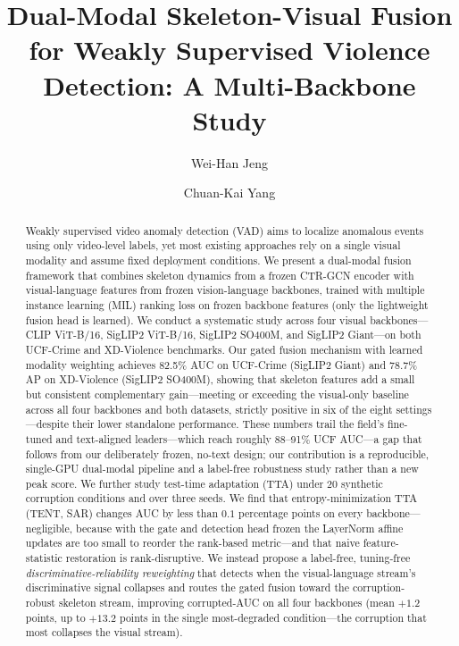 \documentclass[sigconf]{acmart}
\begin{document}
\title{Dual-Modal Skeleton-Visual Fusion for Weakly Supervised Violence Detection: A Multi-Backbone Study}

\author{Wei-Han Jeng}

\author{Chuan-Kai Yang}

\begin{abstract}
Weakly supervised video anomaly detection (VAD) aims to localize anomalous events using only video-level labels, yet most existing approaches rely on a single visual modality and assume fixed deployment conditions. We present a dual-modal fusion framework that combines skeleton dynamics from a frozen CTR-GCN encoder with visual-language features from frozen vision-language backbones, trained with multiple instance learning (MIL) ranking loss on frozen backbone features (only the lightweight fusion head is learned). We conduct a systematic study across four visual backbones---CLIP ViT-B/16, SigLIP2 ViT-B/16, SigLIP2 SO400M, and SigLIP2 Giant---on both UCF-Crime and XD-Violence benchmarks. Our gated fusion mechanism with learned modality weighting achieves 82.5\% AUC on UCF-Crime (SigLIP2 Giant) and 78.7\% AP on XD-Violence (SigLIP2 SO400M), showing that skeleton features add a small but consistent complementary gain---meeting or exceeding the visual-only baseline across all four backbones and both datasets, strictly positive in six of the eight settings---despite their lower standalone performance. These numbers trail the field's fine-tuned and text-aligned leaders---which reach roughly 88--91\% UCF AUC---a gap that follows from our deliberately frozen, no-text design; our contribution is a reproducible, single-GPU dual-modal pipeline and a label-free robustness study rather than a new peak score. We further study test-time adaptation (TTA) under 20 synthetic corruption conditions and over three seeds. We find that entropy-minimization TTA (TENT, SAR) changes AUC by less than $0.1$ percentage points on every backbone---negligible, because with the gate and detection head frozen the LayerNorm affine updates are too small to reorder the rank-based metric---and that naive feature-statistic restoration is rank-disruptive. We instead propose a label-free, tuning-free \emph{discriminative-reliability reweighting} that detects when the visual-language stream's discriminative signal collapses and routes the gated fusion toward the corruption-robust skeleton stream, improving corrupted-AUC on all four backbones (mean $+1.2$ points, up to $+13.2$ points in the single most-degraded condition---the corruption that most collapses the visual stream).
\end{abstract}
\end{document}
